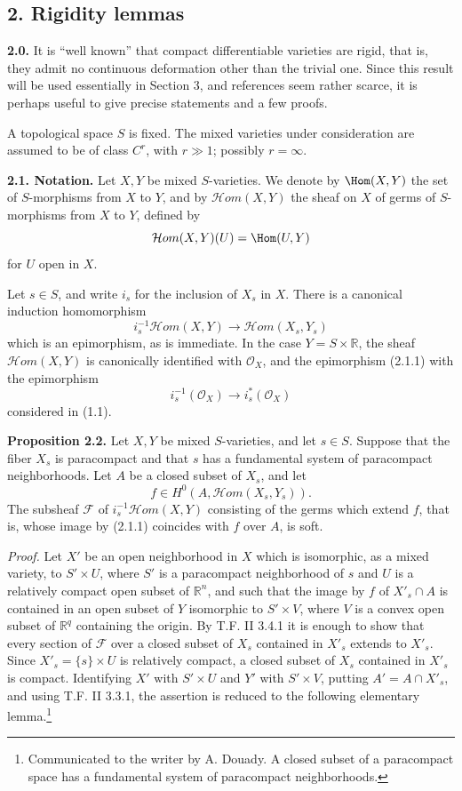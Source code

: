 \documentclass[11pt]{article}
\begin{document}
\subsection*{2. Rigidity lemmas}

\textbf{2.0.} It is ``well known'' that compact differentiable varieties are rigid, that is, they admit no continuous deformation other than the trivial one. Since this result will be used essentially in Section 3, and references seem rather scarce, it is perhaps useful to give precise statements and a few proofs.

A topological space $S$ is fixed. The mixed varieties under consideration are assumed to be of class $C^r$, with $r\gg1$; possibly $r=\infty$.

\textbf{2.1. Notation.} Let $X,Y$ be mixed $S$-varieties. We denote by $\Hom(X,Y)$ the set of $S$-morphisms from $X$ to $Y$, and by $\mathcal Hom(X,Y)$ the sheaf on $X$ of germs of $S$-morphisms from $X$ to $Y$, defined by
\[
 \mathcal Hom(X,Y)(U)=\Hom(U,Y)
\]
for $U$ open in $X$.

Let $s\in S$, and write $i_s$ for the inclusion of $X_s$ in $X$. There is a canonical induction homomorphism
\begin{equation}\tag{2.1.1}
 i_s^{-1}\mathcal Hom(X,Y)\longrightarrow \mathcal Hom(X_s,Y_s)
\end{equation}
which is an epimorphism, as is immediate. In the case $Y=S\times\mathbb R$, the sheaf $\mathcal Hom(X,Y)$ is canonically identified with $\mathcal O_X$, and the epimorphism (2.1.1) with the epimorphism
\[
 i_s^{-1}(\mathcal O_X)\longrightarrow i_s^*(\mathcal O_X)
\]
considered in (1.1).

\textbf{Proposition 2.2.} Let $X,Y$ be mixed $S$-varieties, and let $s\in S$. Suppose that the fiber $X_s$ is paracompact and that $s$ has a fundamental system of paracompact neighborhoods. Let $A$ be a closed subset of $X_s$, and let
\[
 f\in H^0(A,\mathcal Hom(X_s,Y_s)).
\]
The subsheaf $\mathcal F$ of $i_s^{-1}\mathcal Hom(X,Y)$ consisting of the germs which extend $f$, that is, whose image by (2.1.1) coincides with $f$ over $A$, is soft.

\emph{Proof.} Let $X'$ be an open neighborhood in $X$ which is isomorphic, as a mixed variety, to $S'\times U$, where $S'$ is a paracompact neighborhood of $s$ and $U$ is a relatively compact open subset of $\mathbb R^n$, and such that the image by $f$ of $X'_s\cap A$ is contained in an open subset of $Y$ isomorphic to $S'\times V$, where $V$ is a convex open subset of $\mathbb R^q$ containing the origin. By T.F. II 3.4.1 it is enough to show that every section of $\mathcal F$ over a closed subset of $X_s$ contained in $X'_s$ extends to $X'_s$. Since $X'_s=\{s\}\times U$ is relatively compact, a closed subset of $X_s$ contained in $X'_s$ is compact. Identifying $X'$ with $S'\times U$ and $Y'$ with $S'\times V$, putting $A'=A\cap X'_s$, and using T.F. II 3.3.1, the assertion is reduced to the following elementary lemma.\footnote{Communicated to the writer by A. Douady. A closed subset of a paracompact space has a fundamental system of paracompact neighborhoods.}
\end{document}
